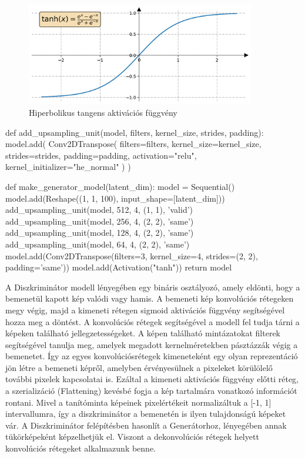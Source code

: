 \begin{figure}[h]
\centering
\includegraphics[width=10cm]{images/tanh.png}
\caption{Hiperbolikus tangens aktivációs függvény}
\label{fig:tanh}
\end{figure}

\begin{python}
def add_upsampling_unit(model,
                        filters, kernel_size, strides, padding):
    model.add(
        Conv2DTranspose(
            filters=filters, kernel_size=kernel_size,
            strides=strides,
            padding=padding, activation="relu",
            kernel_initializer="he_normal"
        )
    )
    
def make_generator_model(latent_dim):
    model = Sequential()
    model.add(Reshape((1, 1, 100), input_shape=[latent_dim]))
    add_upsampling_unit(model, 512, 4, (1, 1), 'valid')
    add_upsampling_unit(model, 256, 4, (2, 2), 'same')
    add_upsampling_unit(model, 128, 4, (2, 2), 'same')
    add_upsampling_unit(model, 64, 4, (2, 2), 'same')
    model.add(Conv2DTranspose(filters=3, kernel_size=4,
                              strides=(2, 2), padding='same'))
    model.add(Activation("tanh"))
    return model
\end{python}


A Diszkriminátor modell lényegében egy bináris osztályozó, amely eldönti, hogy a bemenetül kapott kép valódi vagy hamis. A bemeneti kép konvolúciós rétegeken megy végig, majd a kimeneti rétegen sigmoid aktivációs függvény segítségével hozza meg a döntést. A konvolúciós rétegek segítségével a modell fel tudja tárni a képeken található jellegzetességeket. A képen található mintázatokat filterek segítségével tanulja meg, amelyek megadott kernelméretekben pásztázzák végig a bemenetet. Így az egyes konvolúciósrétegek kimeneteként egy olyan reprezentáció jön létre a bemeneti képről, amelyben érvényesülnek a pixeleket körülölelő további pixelek kapcsolatai is. Ezáltal a kimeneti aktivációs függvény előtti réteg, a szerializáció (Flattening) kevésbé fogja a kép tartalmára vonatkozó információt rontani. Mivel a tanítóminta képeinek pixelértékeit normalizáltuk a [-1, 1] intervallumra, így a diszkriminátor a bemenetén is ilyen tulajdonságú képeket vár. A Diszkriminátor felépítésben hasonlít a Generátorhoz, lényegében annak tükörképeként képzelhetjük el. Viszont a dekonvolúciós rétegek helyett konvolúciós rétegeket alkalmazunk benne.

